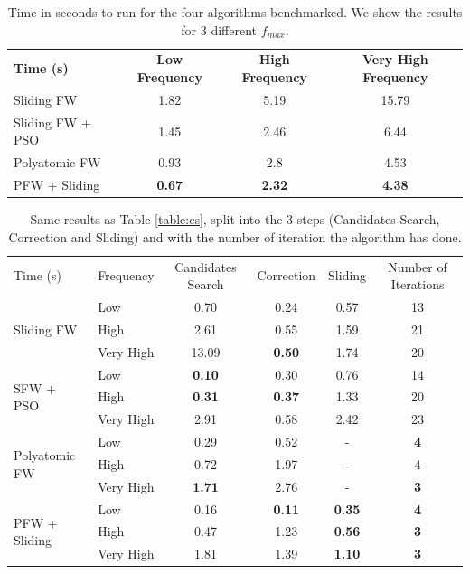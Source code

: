 \documentclass[a4paper,12pt,oneside]{report}
\theoremstyle{named}
\begin{document}
\begin{table}
  \centering
  \renewcommand{\arraystretch}{1.2}
  \begin{tabular}{|p{2.5cm}|ccc|}
    \hline
    \multirow{2}{3cm}{\textbf{Time (s)}} & \multirow{2}{2.5cm}{\textbf{Low Frequency}} & \multirow{2}{3cm}{\textbf{High Frequency}} & \multirow{2}{3cm}{\textbf{Very High Frequency}}\\
     &  &  &   \\
    \hline
    Sliding FW & 1.82 & 5.19 & 15.79   \\ \hline
    Sliding FW + PSO & 1.45 & 2.46 & 6.44   \\ \hline
    Polyatomic FW & 0.93 & 2.8 & 4.53 \\ \hline
    PFW + Sliding & \textbf{0.67} & \textbf{2.32} & \textbf{4.38}\\ \hline
  \end{tabular}
  \caption{Time in seconds to run for the four algorithms benchmarked. We show the results for 3 different $f_{max}$.}
  \label{table:PFWvsSFW}
\end{table}

\begin{table}
\centering
\renewcommand{\arraystretch}{1.1}
\begin{tabular}{|p{2.75cm}|l|c|c|c|c|}
\hline
\multirow{2}{2cm}{Time (s)} & \multirow{2}{2cm}{Frequency} & \multirow{2}{2cm}{Candidates Search} & \multirow{2}{2cm}{Correction} &  \multirow{2}{1.25cm}{Sliding} &  \multirow{2}{2cm}{Number of Iterations}\\
 &  &  &  &  &  \\
\hline
\multirow[t]{3}{*}{Sliding FW} 
& Low & 0.70 & 0.24 & 0.57 &  13 \\
 & High & 2.61 & 0.55 & 1.59 &  21 \\
 & Very High & 13.09 & \textbf{0.50} & 1.74 & 20 \\
\cline{1-6}
\multirow[t]{3}{*}{SFW + PSO}
& Low & \textbf{0.10} & 0.30 & 0.76 & 14 \\
& High & \textbf{0.31} & \textbf{0.37} & 1.33 & 20 \\
& Very High & 2.91 & 0.58 & 2.42 & 23 \\
\cline{1-6}
\multirow[t]{3}{*}{Polyatomic FW}
& Low & 0.29 & 0.52 & - & \textbf{4} \\
& High & 0.72 & 1.97 & - & 4 \\
& Very High & \textbf{1.71} & 2.76 & - & \textbf{3} \\
\cline{1-6}
\multirow[t]{3}{*}{PFW + Sliding}
& Low & 0.16 & \textbf{0.11} & \textbf{0.35} & \textbf{4}\\
& High & 0.47 & 1.23 &  \textbf{0.56} & \textbf{3}\\
& Very High & 1.81 & 1.39 &  \textbf{1.10} & \textbf{3}\\
\hline
\end{tabular}
  \caption{Same results as Table \ref{table:cs}, split into the 3-steps (Candidates Search, Correction and Sliding) and with the number of iteration the algorithm has done.}
  \label{table:PFWvsSFW2}
\end{table}
\end{document}
